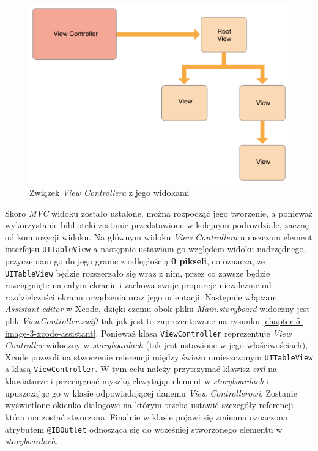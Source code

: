 \begin{figure}[ht!]
  \centering
  \includegraphics[width=120mm]{images/chapter-5-image-2-viewcontroller-relationship.png}
  \caption{Związek \textit{View Controllera} z jego widokami\cite{viewControllerProgrammingGuideforiOS}}
  \label{chapter-5-image-2-viewcontroller-relationship}
\end{figure}

Skoro \textit{MVC} widoku zostało ustalone, można rozpocząć jego tworzenie, a ponieważ wykorzystanie biblioteki zostanie przedstawione w kolejnym podrozdziale, zacznę od kompozycji widoku. Na głównym widoku \textit{View Controllera} upuszczam element interfejsu \texttt{UITableView} a następnie ustawiam go względem widoku nadrzędnego, przyczepiam go do jego granic z odległością \textbf{0 pikseli}, co oznacza, że \texttt{UITableView} będzie rozszerzało się wraz z nim, przez co zawsze będzie rozciągnięte na całym ekranie i zachowa swoje proporcje niezależnie od rozdzielczości ekranu urządzenia oraz jego orientacji. Następnie włączam \textit{Assistant editor} w Xcode, dzięki czemu obok pliku \textit{Main.storyboard} widoczny jest plik \textit{ViewController.swift} tak jak jest to zaprezentowane na rysunku \ref{chapter-5-image-3-xcode-assistant}. Ponieważ klasa \texttt{ViewController} reprezentuje \textit{View Controller} widoczny w \textit{storyboardach} (tak jest ustawione w jego właściwościach), Xcode pozwoli na stworzenie referencji między świeżo umieszczonym \texttt{UITableView} a klasą \texttt{ViewController}. W tym celu należy przytrzymać klawisz \textit{crtl} na klawiaturze i przeciągnąć myszką chwytając element w \textit{storyboardach} i upuszczając go w klasie odpowiadającej danemu \textit{View Controllerowi}. Zostanie wyświetlone okienko dialogowe na którym trzeba ustawić szczegóły referencji która ma zostać stworzona. Finalnie w klasie pojawi się zmienna oznaczona atrybutem \texttt{@IBOutlet} odnosząca się do wcześniej stworzonego elementu w \textit{storyboardach}.

